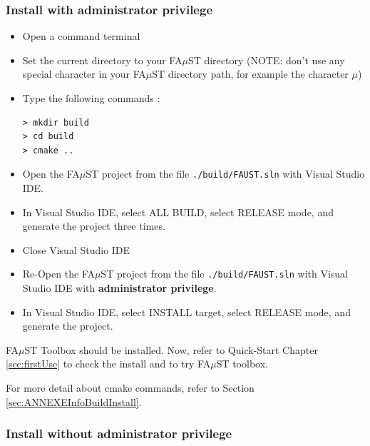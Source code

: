 \subsubsection{Install with administrator privilege}
\label{sec:AdminWinVisualStudioBasicInstall}
\begin{itemize}
\item Open a command terminal
\item Set the current directory to your FA$\mu$ST directory (NOTE: don't use any special character in your FA$\mu$ST directory path, for example the character $\mu$)
\item Type the following commands :

\lstset{style=customBash} 
\begin{lstlisting}
> mkdir build
> cd build
> cmake .. 
\end{lstlisting}

\item Open the FA$\mu$ST project from the file \texttt{./build/FAUST.sln} with Visual Studio IDE.
\item In Visual Studio IDE, select ALL BUILD, select RELEASE mode, and generate the project three times.
\item Close Visual Studio IDE
\item Re-Open the FA$\mu$ST project from the file \texttt{./build/FAUST.sln} with Visual Studio IDE with \textbf{administrator privilege}.
\item In Visual Studio IDE, select INSTALL target, select RELEASE mode, and generate the project.
\end{itemize}

FA$\mu$ST Toolbox should be installed. Now, refer to Quick-Start Chapter \ref{sec:firstUse} to check the install and to try FA$\mu$ST toolbox.

For more detail about cmake commands, refer to Section \ref{sec:ANNEXEInfoBuildInstall}.

 
\subsubsection{Install without administrator privilege}
\label{sec:NoAdminWinVisualStudioBasicInstall}

